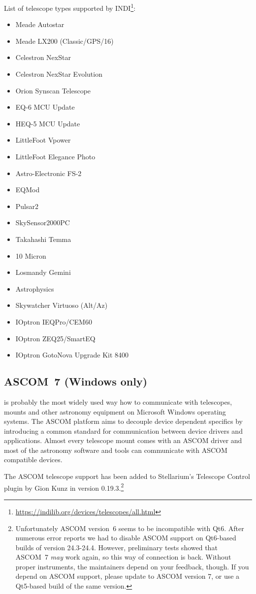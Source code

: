 List of telescope types supported by INDI\footnote{\url{https://indilib.org/devices/telescopes/all.html}}:
\begin{itemize}
\item Meade Autostar
\item Meade LX200 (Classic/GPS/16)
\item Celestron NexStar
\item Celestron NexStar Evolution
\item Orion Synscan Telescope
\item EQ-6 MCU Update
\item HEQ-5 MCU Update
\item LittleFoot Vpower
\item LittleFoot Elegance Photo
\item Astro-Electronic FS-2
\item EQMod
\item Pulsar2
\item SkySensor2000PC
\item Takahashi Temma
\item 10 Micron
\item Losmandy Gemini
\item Astrophysics
\item Skywatcher Virtuoso (Alt/Az)
\item IOptron IEQPro/CEM60
\item IOptron ZEQ25/SmartEQ
\item IOptron GotoNova Upgrade Kit 8400
\end{itemize}

\subsection{ASCOM~7 (Windows only)}
\label{sec:plugins:TelescopeControl:ASCOM}

 is probably the most widely used
way how to communicate with telescopes, mounts and other astronomy
equipment on Microsoft Windows operating systems. The ASCOM platform
aims to decouple device dependent specifics by introducing a common
standard for communication between device drivers and
applications. Almost every telescope mount comes with an ASCOM driver
and most of the astronomy software and tools can communicate with
ASCOM compatible devices.

The ASCOM telescope support has been added to Stellarium's Telescope Control plugin by Gion Kunz in version 0.19.3.\footnote{%
Unfortunately ASCOM version~6 seems to be incompatible with Qt6. 
After numerous error reports we had to disable ASCOM support on Qt6-based builds of version 24.3-24.4. 
However, preliminary tests showed that ASCOM~7 \emph{may} work again, so this way of connection is back. 
Without proper instruments, the maintainers depend on your feedback, though. 
If you depend on ASCOM support, please update to ASCOM version 7, or use a Qt5-based build of the same version.}

